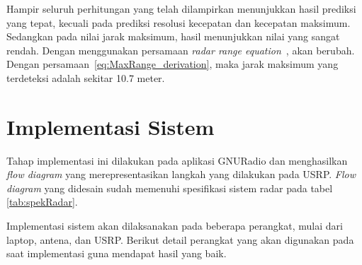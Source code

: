 Hampir seluruh perhitungan yang telah dilampirkan menunjukkan hasil prediksi yang tepat, kecuali pada prediksi resolusi kecepatan dan kecepatan maksimum. Sedangkan pada nilai jarak maksimum, hasil menunjukkan nilai yang sangat rendah. Dengan menggunakan persamaan \textit{radar range equation}~\cite{Skolnik2001},  akan berubah. Dengan persamaan~\ref{eq:MaxRange_derivation}, maka jarak maksimum yang terdeteksi adalah sekitar 10.7 meter.

\section{Implementasi Sistem}
Tahap implementasi ini dilakukan pada aplikasi GNURadio dan menghasilkan \textit{flow diagram} yang merepresentasikan langkah yang dilakukan pada USRP. \textit{Flow diagram} yang didesain sudah memenuhi spesifikasi sistem radar pada tabel \ref{tab:spekRadar}. 

Implementasi sistem akan dilaksanakan pada beberapa perangkat, mulai dari laptop, antena, dan USRP. Berikut detail perangkat yang akan digunakan pada saat implementasi guna mendapat hasil yang baik.

